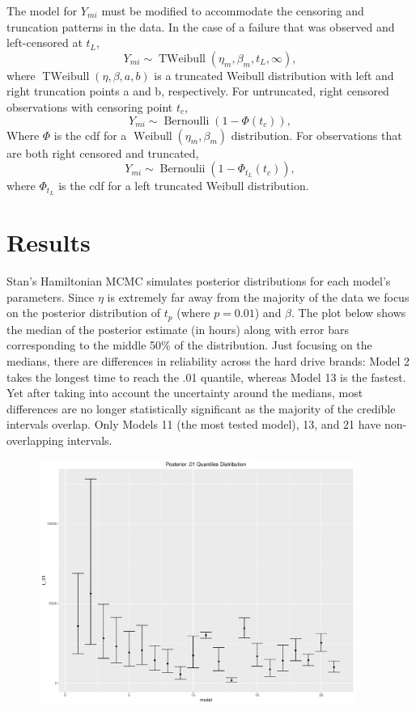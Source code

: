 \documentclass{scrartcl}
\begin{document}
\noindent The model for $Y_{mi}$ must be modified to accommodate the censoring and truncation patterns in the data. In the case of a failure that was observed and left-censored at $t_L$,
\[Y_{mi} \sim \operatorname{TWeibull}(\eta_m, \beta_m, t_L, \infty),\]
where $\operatorname{TWeibull}(\eta,\beta,a,b)$ is a truncated Weibull distribution with left and right truncation points a and b, respectively. For untruncated, right censored observations with censoring point $t_c$,
\[Y_{mi} \sim \operatorname{Bernoulli}(1-\Phi(t_c)),\]
Where $\Phi$ is the cdf for a $\operatorname{Weibull}(\eta_m,\beta_m)$ distribution.
For observations that are both right censored and truncated,
\[Y_{mi} \sim \operatorname{Bernoulii}(1-\Phi_{t_L}(t_c)),\]
where $\Phi_{t_L}$ is the cdf for a left truncated Weibull distribution. 

\section*{Results}
Stan's Hamiltonian MCMC simulates posterior distributions for each model's parameters.  Since $\eta$ is extremely far away from the majority of the data we focus on the posterior distribution of $t_p$ (where $p=0.01$) and $\beta$.  The plot below shows the median of the posterior estimate (in hours) along with error bars corresponding to the middle 50\% of the distribution.  Just focusing on the medians, there are differences in reliability across the hard drive brands: Model 2 takes the longest time to reach the .01 quantile, whereas Model 13 is the fastest.  Yet after taking into account the uncertainty around the medians, most differences are no longer statistically significant as the majority of the credible intervals overlap.  Only Models 11 (the most tested model), 13, and 21 have non-overlapping intervals.
\begin{figure}[H]
\centering
\includegraphics[height=8cm]{postquant.pdf}
\end{figure}
\end{document}

